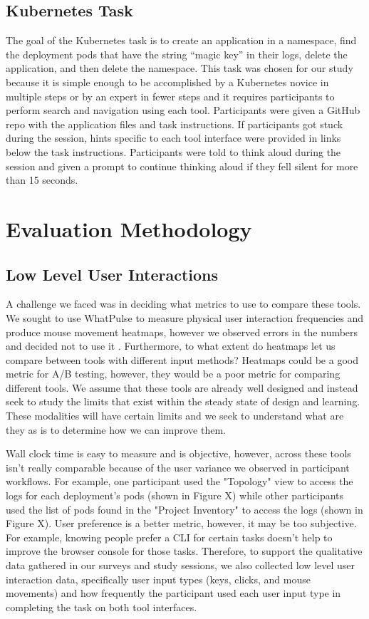 \documentclass[11pt, oneside]{article}   	%
\begin{document}
\subsection{Kubernetes Task}
The goal of the Kubernetes task is to create an application in a namespace, find the deployment pods that have the string “magic key” in their logs, delete the application, and then delete the namespace. This task was chosen for our study because it is simple enough to be accomplished by a Kubernetes novice in multiple steps or by an expert in fewer steps and it requires participants to perform search and navigation using each tool. Participants were given a GitHub repo with the application files and task instructions. If participants got stuck during the session, hints specific to each tool interface were provided in links below the task instructions. Participants were told to think aloud during the session and given a prompt to continue thinking aloud if they fell silent for more than 15 seconds.

\section{Evaluation Methodology}
\subsection{Low Level User Interactions}
A challenge we faced was in deciding what metrics to use to compare these tools. We sought to use WhatPulse to measure physical user interaction frequencies and produce mouse movement heatmaps, however we observed errors in the numbers and decided not to use it \cite{}. Furthermore, to what extent do heatmaps let us compare between tools with different input methods? Heatmaps could be a good metric for A/B testing, however, they would be a poor metric for comparing different tools. We assume that these tools are already well designed and instead seek to study the limits that exist within the steady state of design and learning. These modalities will have certain limits and we seek to understand what are they as is to determine how we can improve them. 

Wall clock time is easy to measure and is objective, however, across these tools isn’t really comparable because of the user variance we observed in participant workflows. For example, one participant used the "Topology" view to access the logs for each deployment's pods (shown in Figure X) while other participants used the list of pods found in the "Project Inventory" to access the logs (shown in Figure X). User preference is a better metric, however, it may be too subjective. For example, knowing people prefer a CLI for certain tasks doesn’t help to improve the browser console for those tasks. Therefore, to support the qualitative data gathered in our surveys and study sessions, we also collected low level user interaction data, specifically user input types (keys, clicks, and mouse movements) and how frequently the participant used each user input type in completing the task on both tool interfaces. 
\end{document}
